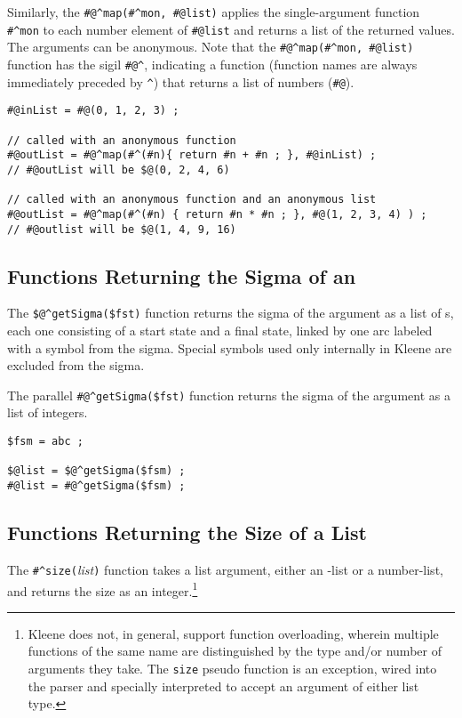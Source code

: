 Similarly, the 
\verb!#@^map(#^mon, #@list)!  applies the single-argument 
function \verb!#^mon! to each number
element of \verb!#@list! and returns a list of the returned values.  The
arguments can be anonymous.  Note that the \verb!#@^map(#^mon, #@list)! function has the sigil
\verb!#@^!, indicating a function (function names are always immediately preceded by
\verb!^!) that returns a list of numbers (\verb!#@!).

\begin{Verbatim}
#@inList = #@(0, 1, 2, 3) ;

// called with an anonymous function
#@outList = #@^map(#^(#n){ return #n + #n ; }, #@inList) ;
// #@outList will be $@(0, 2, 4, 6)

// called with an anonymous function and an anonymous list
#@outList = #@^map(#^(#n) { return #n * #n ; }, #@(1, 2, 3, 4) ) ;
// #@outlist will be $@(1, 4, 9, 16)
\end{Verbatim}

\subsection{Functions Returning the Sigma of an \fsm{}}

The \verb+$@^getSigma($fst)+ function returns the sigma of the argument
\fsm{} as a list of \fsm{}s, each one consisting of a start state and a final
state, linked by one arc labeled with a symbol from the sigma.  Special symbols
used only internally in Kleene are excluded from the sigma.

The parallel \verb+#@^getSigma($fst)+ function returns the sigma of the argument
\fsm{} as a list of integers.

\begin{Verbatim}
$fsm = abc ;

$@list = $@^getSigma($fsm) ;
#@list = #@^getSigma($fsm) ;
\end{Verbatim}

\subsection{Functions Returning the Size of a List}

The \verb+#^size(+\textit{list}\verb!)! function takes a list argument,
either an \fsm{}-list or a number-list, and returns the
size as an integer.\footnote{Kleene does not, in general, support function
overloading, wherein multiple functions of the same name are distinguished
by the type and/or number of arguments they take.
The \texttt{size} pseudo function is an exception,
wired into the parser and specially interpreted to accept an argument of either list
type.}

